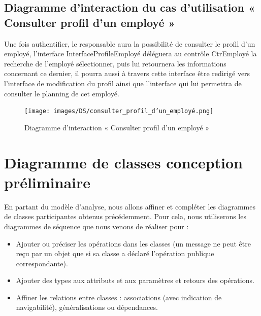 \begin{itemize}
        \subsection*{Diagramme d'interaction du cas d'utilisation « Consulter profil d'un employé »}
        Une fois authentifier, le responsable aura la possibilité de consulter le profil d’un employé, l’interface InterfaceProfileEmployé déléguera au contrôle CtrEmployé la recherche de l’employé sélectionner, puis lui retournera les informations concernant ce dernier, il pourra aussi à travers cette interface être redirigé vers l’interface de modification du profil ainsi que l’interface qui lui permettra de consulter le planning de cet employé.
        
        \clearpage
        
        \begin{figure}[h!]
                 \centering
                \texttt{[image: images/DS/consulter\_profil\_d'un\_employé.png]}
                 \caption{Diagramme d'interaction « Consulter profil d'un employé »}
                 \label{fig42}
        \end{figure}
    
\section{Diagramme de classes conception préliminaire}
En partant du modèle d’analyse, nous allons affiner et compléter les diagrammes de classes participantes obtenus précédemment. Pour cela, nous utiliserons les diagrammes de séquence que nous venons de réaliser pour :
    \begin{itemize}
        \item [\textbullet] Ajouter ou préciser les opérations dans les classes (un message ne peut être reçu par un objet que si sa classe a déclaré l’opération publique correspondante).
        
        \item [\textbullet] Ajouter des types aux attributs et aux paramètres et retours des opérations. 
        
        \item [\textbullet] Affiner les relations entre classes : associations (avec indication de navigabilité), généralisations ou dépendances.\cite{5}
                    
    \end{itemize}
    
    \clearpage


\end{itemize}

